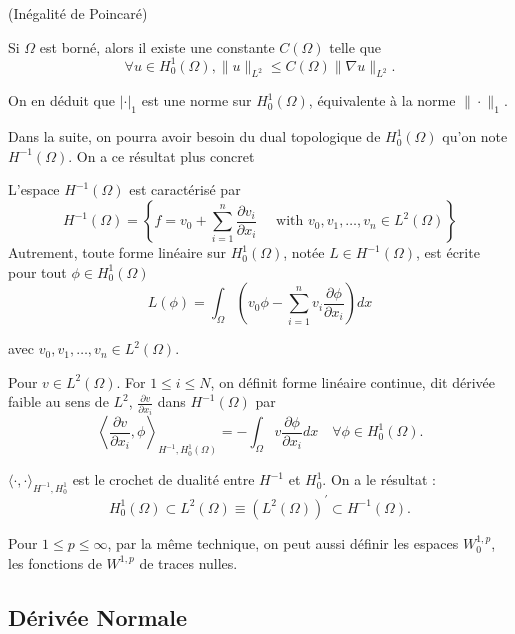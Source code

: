 \begin{theorem}(Inégalité de Poincaré) \
	
	Si $\Omega$ est borné, alors il existe une constante $C(\Omega)$ telle que 
	$$
	\forall u \in H_{0}^{1}(\Omega),\|u\|_{L^2} \leq C(\Omega)\|\nabla u\|_{L^2} .
	$$
	
On en déduit que $|\cdot|_{1}$ est une norme sur $H_{0}^{1}(\Omega)$, équivalente à la norme $\|\cdot\|_{1}$.


\end{theorem}

Dans la suite, on pourra avoir besoin du dual topologique  de $H_{0}^{1}(\Omega)$ qu'on note $H^{-1}(\Omega)$. On a ce résultat plus concret 


\begin{proposition}
	
	L'espace $H^{-1}(\Omega)$  est caractérisé par 
$$
H^{-1}(\Omega)=\left\{f=v_{0}+\sum_{i=1}^{n} \frac{\partial v_{i}}{\partial x_{i}} \quad \text { with } v_{0}, v_{1}, \ldots, v_{n} \in L^{2}(\Omega)\right\}
$$
Autrement, toute forme linéaire sur  $H_{0}^{1}(\Omega)$,  notée  $L \in H^{-1}(\Omega)$, est écrite  pour tout  $\phi \in H_{0}^{1}(\Omega)$
$$
L(\phi)=\int_{\Omega}\left(v_{0} \phi-\sum_{i=1}^{n} v_{i} \frac{\partial \phi}{\partial x_{i}}\right) d x
$$

avec  $v_{0}, v_{1}, \ldots, v_{n} \in L^{2}(\Omega)$.

Pour  $v \in L^{2}(\Omega) .$ For $1 \leq i \leq N$,  on définit forme linéaire  continue, dit dérivée faible au sens de $L^2$,  $\frac{\partial v}{\partial x_{i}}$ dans  $H^{-1}(\Omega)$ par 
$$
\left\langle\frac{\partial v}{\partial x_{i}}, \phi\right\rangle_{H^{-1}, H_{0}^{1}(\Omega)}=-\int_{\Omega} v \frac{\partial \phi}{\partial x_{i}} d x \quad \forall \phi \in H_{0}^{1}(\Omega).
$$

$\langle\cdot, \cdot \rangle_{H^{-1}, H_{0}^{1}}$ est   le crochet de dualité entre $H^{-1}$ et $H_{0}^{1}$.  On a le résultat : $$H_{0}^{1}(\Omega) \subset L^{2}(\Omega) \equiv\left(L^{2}(\Omega)\right)^{\prime} \subset H^{-1}(\Omega).
$$

\end{proposition}

Pour $1\leq p\leq \infty$, par la même technique, on peut aussi  définir les espaces  $W^{1,p}_0$, les fonctions de $W^{1,p}$ de traces nulles. 

\subsection{Dérivée Normale}

